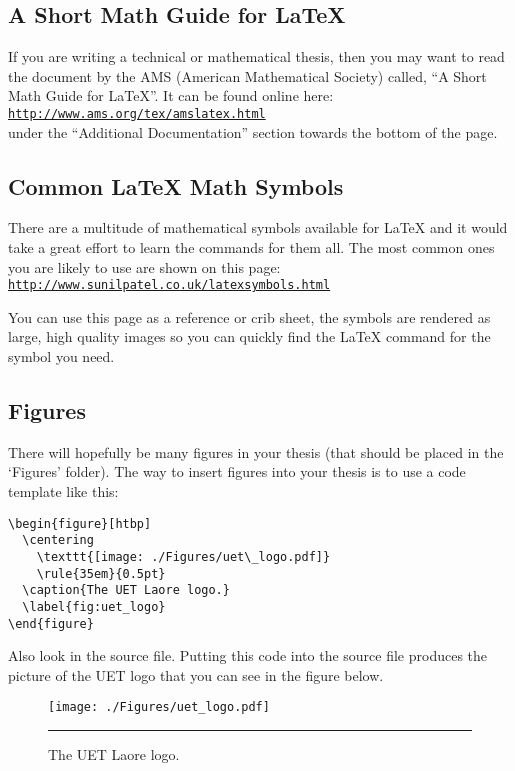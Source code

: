 \subsection{A Short Math Guide for \LaTeX{}}

If you are writing a technical or mathematical thesis, then you may want to read the document by the AMS (American Mathematical Society) called, ``A Short Math Guide for \LaTeX{}''. It can be found online here:\\
\href{http://www.ams.org/tex/amslatex.html}{\texttt{http://www.ams.org/tex/amslatex.html}}\\
under the ``Additional Documentation'' section towards the bottom of the page.

\subsection{Common \LaTeX{} Math Symbols}
There are a multitude of mathematical symbols available for \LaTeX{} and it would take a great effort to learn the commands for them all. The most common ones you are likely to use are shown on this page:\\
\href{http://www.sunilpatel.co.uk/latexsymbols.html}{\texttt{http://www.sunilpatel.co.uk/latexsymbols.html}}

You can use this page as a reference or crib sheet, the symbols are rendered as large, high quality images so you can quickly find the \LaTeX{} command for the symbol you need.



\subsection{Figures}

There will hopefully be many figures in your thesis (that should be placed in the `Figures' folder). The way to insert figures into your thesis is to use a code template like this:
\begin{verbatim}
\begin{figure}[htbp]
  \centering
    \texttt{[image: ./Figures/uet\_logo.pdf]}
    \rule{35em}{0.5pt}
  \caption{The UET Laore logo.}
  \label{fig:uet_logo}
\end{figure}
\end{verbatim}
Also look in the source file. Putting this code into the source file produces the picture of the UET logo that you can see in the figure below.

\begin{figure}[htbp]
	\centering
		\texttt{[image: ./Figures/uet\_logo.pdf]}
		\rule{35em}{0.5pt}
	\caption{The UET Laore logo.}
	\label{fig:uet_logo}
\end{figure}

